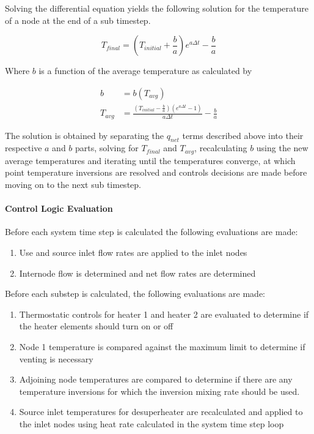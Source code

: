 Solving the differential equation yields the following solution for the temperature of a node at the end of a sub timestep. 

\begin{equation}
  T_{final} = \left( T_{initial} + \frac{b}{a} \right) e ^ {a \Delta t} - \frac{b}{a}
\end{equation}

Where $b$ is a function of the average temperature as calculated by

\begin{equation}
  \begin{array}{rl}
    b &= b(T_{avg}) \\
    T_{avg} &= \frac{(T_{initial} - \frac{b}{a}) (e ^ {a \Delta t} - 1)}{a \Delta t} - \frac{b}{a}
  \end{array}
\end{equation}

The solution is obtained by separating the $q_{net}$ terms described above into their respective $a$ and $b$ parts, solving for $T_{final}$ and $T_{avg}$, recalculating $b$ using the new average temperatures and iterating until the temperatures converge, at which point temperature inversions are resolved and controls decisions are made before moving on to the next sub timestep.

\paragraph{Control Logic Evaluation}

Before each system time step is calculated the following evaluations are made:

\begin{enumerate}
\item Use and source inlet flow rates are applied to the inlet nodes
\item Internode flow is determined and net flow rates are determined
\end{enumerate}

Before each substep is calculated, the following evaluations are made:

\begin{enumerate}
\item Thermostatic controls for heater 1 and heater 2 are evaluated to determine if the heater elements should turn on or off
\item Node 1 temperature is compared against the maximum limit to determine if venting is necessary
\item Adjoining node temperatures are compared to determine if there are any temperature inversions for which the inversion mixing rate should be used.
\item Source inlet temperatures for desuperheater are recalculated and applied to the inlet nodes using heat rate calculated in the system time step loop
\end{enumerate}

